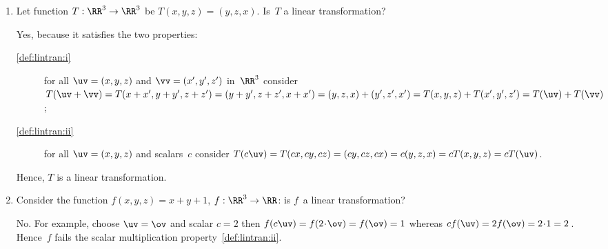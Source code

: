 \begin{example} \label{eg:}
\begin{enumerate}
\item Let function \(T:\RR^3\to\RR^3\) be \(T(x,y,z)=(y,z,x)\).  
Is~\(T\) a linear transformation?
\begin{solution} 
Yes, because it satisfies the two properties:
\begin{description}
\item[\ref{def:lintran:i}] for all \(\uv=(x,y,z)\) and \(\vv=(x',y',z')\) in~\(\RR^3\) consider \(T(\uv+\vv)
=T(x+x',y+y',z+z')
=(y+y',z+z',x+x')
=(y,z,x)+(y',z',x')
=T(x,y,z)+T(x',y',z')
=T(\uv)+T(\vv)\);

\item[\ref{def:lintran:ii}] for all \(\uv=(x,y,z)\) and scalars~\(c\)
consider \(T(c\uv)
=T(cx,cy,cz)
=(cy,cz,cx)
=c(y,z,x)
=cT(x,y,z)
=cT(\uv)\).
\end{description}
Hence, \(T\) is a linear transformation.
\end{solution}

\item Consider the function \(f(x,y,z)=x+y+1\), \(f:\RR^3\to\RR\): is \(f\)~a linear transformation?
\begin{solution} 
No.  For example, choose \(\uv=\ov\) and scalar \(c=2\) then \(f(c\uv)=f(2\cdot\ov)=f(\ov)=1\) whereas \(cf(\uv)=2f(\ov)=2\cdot 1=2\)\,.
Hence~\(f\) fails the scalar multiplication property~\ref{def:lintran:ii}.
\end{solution}



\end{enumerate}
\end{example}
